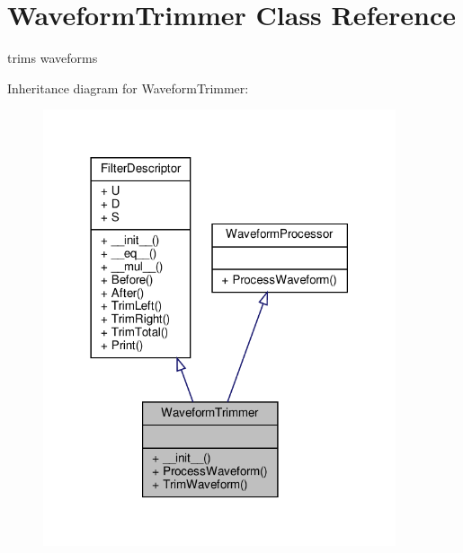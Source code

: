\hypertarget{classSignalIntegrity_1_1TimeDomain_1_1Filters_1_1WaveformTrimmer_1_1WaveformTrimmer}{}\section{Waveform\+Trimmer Class Reference}
\label{classSignalIntegrity_1_1TimeDomain_1_1Filters_1_1WaveformTrimmer_1_1WaveformTrimmer}


trims waveforms  




Inheritance diagram for Waveform\+Trimmer\+:\nopagebreak
\begin{figure}[H]
\begin{center}
\leavevmode
\includegraphics[width=294pt]{classSignalIntegrity_1_1TimeDomain_1_1Filters_1_1WaveformTrimmer_1_1WaveformTrimmer__inherit__graph}
\end{center}
\end{figure}


